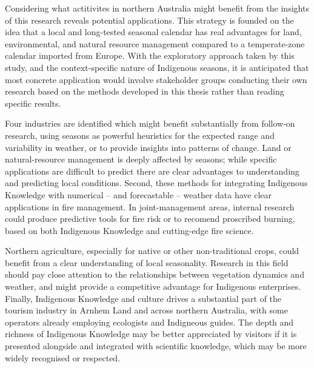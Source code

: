 Considering what actitivites in northern Australia might benefit from the
insights of this research reveals potential applications.  This strategy is
founded on the idea that a local and long-tested seasonal calendar has real
advantages for land, environmental, and natural resource management compared
to a temperate-zone calendar imported from Europe.
%
With the exploratory approach taken by this study, and the context-specific
nature of Indigenous seasons, it is anticipated that most concrete application
would involve stakeholder groups conducting their own research based on the
methods developed in this thesis rather than reading specific results.


Four industries are identified which might benefit substantially from follow-on
research, using seasons as powerful heuristics for the expected range
and variability in weather, or to provide insights into patterns of change.
%
Land or natural-resource management is deeply affected by seasons; while
specific applications are difficult to predict there are clear advantages
to understanding and predicting local conditions.
%
Second, these methods for integrating Indigenous Knowledge with numerical --
and forecastable -- weather data have clear applications in fire management.
In joint-management areas, internal research could produce predictive tools
for fire risk or to recomend proscribed burning, based on both Indigenous
Knowledge and cutting-edge fire science.

Northern agriculture, especially for native or other non-traditional crops,
could benefit from a clear understanding of local seasonality.  Research in
this field should pay close attention to the relationships between vegetation
dynamics and weather, and might provide a competitive advantage for Indigenous
enterprises.
%
Finally, Indigenous Knowledge and culture drives a substantial part of the
tourism industry in Arnhem Land and across northern Australia, with some
operators already employing ecologists and Indigneous guides.  The depth and
richness of Indigenous Knowledge may be better appreciated by visitors if
it is presented alongside and integrated with scientific knowledge, which
may be more widely recognised or respected.


